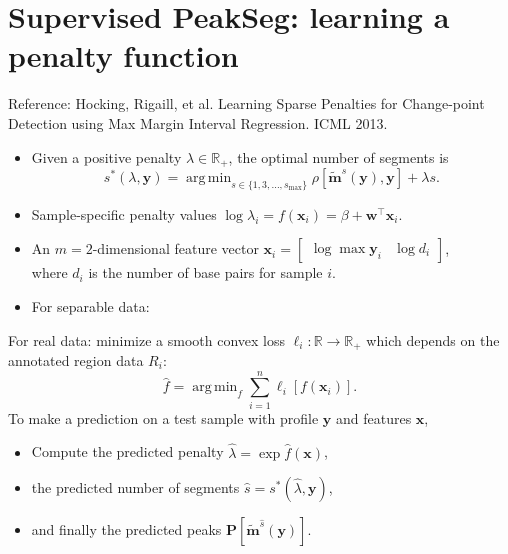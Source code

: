 \documentclass[legalpaper]{article}
\newcommand{\RR}{\mathbb R}
\DeclareMathOperator*{\argmin}{arg\,min}
\begin{document}
\newpage

\section*{Supervised PeakSeg: learning a penalty function}
Reference: Hocking, Rigaill, et al. Learning Sparse Penalties for
Change-point Detection using Max Margin Interval Regression. ICML
2013.

\begin{itemize}
\item Given a positive penalty $\lambda\in\RR_+$, the optimal number
  of segments is
\begin{equation*} s^*(\lambda, \mathbf y) =
    \argmin_{s\in\{1,3,\dots, s_{\text{max}}\}} \rho\left[
      \mathbf{\tilde m}^s(\mathbf y), \mathbf y \right] + \lambda s.
\end{equation*}
\item Sample-specific penalty values $\log \lambda_i = f(\mathbf x_i)
  = \beta + \mathbf w^\intercal \mathbf x_i$.
\item An $m=2$-dimensional feature vector
$\mathbf x_i = \left[\begin{array}{cc} \log\max \mathbf y_i & \log d_i
\end{array}\right]$,\\ where $d_i$ is the number of base pairs for 
sample $i$.
\item For separable data:\\

\end{itemize}

\newpage

For real data: minimize a
smooth convex loss $\ell_i:\RR\rightarrow\RR_+$ which depends on the
annotated region data $R_i$:
\begin{equation*}
  \label{eq:relax}
  \hat f = \argmin_f \sum_{i=1}^n
  \ell_i\left[ f(\mathbf x_i) \right].
\end{equation*}
To make a prediction on a
test sample with profile $\mathbf y$ and features $\mathbf x$,
\begin{itemize}
\item Compute the predicted penalty $\hat \lambda = \exp \hat f(\mathbf x)$,
\item the predicted number of segments $\hat s = s^*(\hat \lambda, \mathbf
y)$, 
\item and finally the predicted peaks $\mathbf P\left[ \mathbf{\tilde
    m}^{\hat s}(\mathbf y) \right]$.
\end{itemize}
\end{document}
